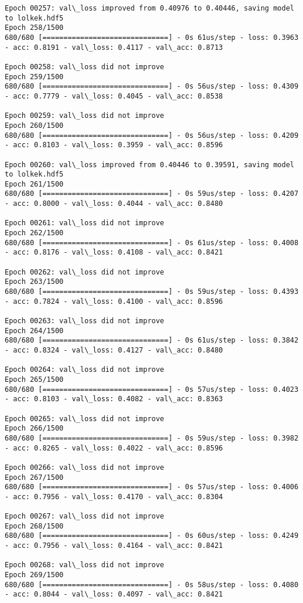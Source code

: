 \documentclass[11pt]{article}
\begin{document}
\begin{Verbatim}[commandchars=\\\{\}]
Epoch 00257: val\_loss improved from 0.40976 to 0.40446, saving model to lolkek.hdf5
Epoch 258/1500
680/680 [==============================] - 0s 61us/step - loss: 0.3963 - acc: 0.8191 - val\_loss: 0.4117 - val\_acc: 0.8713

Epoch 00258: val\_loss did not improve
Epoch 259/1500
680/680 [==============================] - 0s 56us/step - loss: 0.4309 - acc: 0.7779 - val\_loss: 0.4045 - val\_acc: 0.8538

Epoch 00259: val\_loss did not improve
Epoch 260/1500
680/680 [==============================] - 0s 56us/step - loss: 0.4209 - acc: 0.8103 - val\_loss: 0.3959 - val\_acc: 0.8596

Epoch 00260: val\_loss improved from 0.40446 to 0.39591, saving model to lolkek.hdf5
Epoch 261/1500
680/680 [==============================] - 0s 59us/step - loss: 0.4207 - acc: 0.8000 - val\_loss: 0.4044 - val\_acc: 0.8480

Epoch 00261: val\_loss did not improve
Epoch 262/1500
680/680 [==============================] - 0s 61us/step - loss: 0.4008 - acc: 0.8176 - val\_loss: 0.4108 - val\_acc: 0.8421

Epoch 00262: val\_loss did not improve
Epoch 263/1500
680/680 [==============================] - 0s 59us/step - loss: 0.4393 - acc: 0.7824 - val\_loss: 0.4100 - val\_acc: 0.8596

Epoch 00263: val\_loss did not improve
Epoch 264/1500
680/680 [==============================] - 0s 61us/step - loss: 0.3842 - acc: 0.8324 - val\_loss: 0.4127 - val\_acc: 0.8480

Epoch 00264: val\_loss did not improve
Epoch 265/1500
680/680 [==============================] - 0s 57us/step - loss: 0.4023 - acc: 0.8103 - val\_loss: 0.4082 - val\_acc: 0.8363

Epoch 00265: val\_loss did not improve
Epoch 266/1500
680/680 [==============================] - 0s 59us/step - loss: 0.3982 - acc: 0.8265 - val\_loss: 0.4022 - val\_acc: 0.8596

Epoch 00266: val\_loss did not improve
Epoch 267/1500
680/680 [==============================] - 0s 57us/step - loss: 0.4006 - acc: 0.7956 - val\_loss: 0.4170 - val\_acc: 0.8304

Epoch 00267: val\_loss did not improve
Epoch 268/1500
680/680 [==============================] - 0s 60us/step - loss: 0.4249 - acc: 0.7956 - val\_loss: 0.4164 - val\_acc: 0.8421

Epoch 00268: val\_loss did not improve
Epoch 269/1500
680/680 [==============================] - 0s 58us/step - loss: 0.4080 - acc: 0.8044 - val\_loss: 0.4097 - val\_acc: 0.8421


\end{Verbatim}
\end{document}
